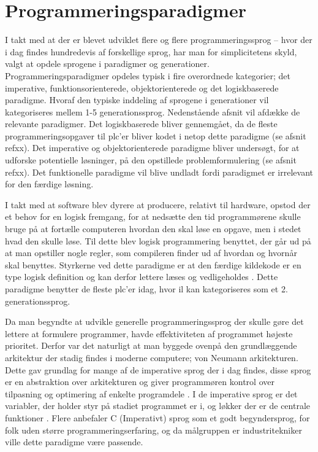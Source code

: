\section{Programmeringsparadigmer}\label{sec:paradigmer}\label{ssec:hovedparadigmer}

I takt med at der er blevet udviklet flere og flere programmeringssprog – hvor der i dag findes hundredevis af forskellige sprog, har man for simplicitetens skyld, valgt at opdele sprogene i paradigmer og generationer. Programmeringsparadigmer opdeles typisk i fire overordnede kategorier; det imperative, funktionsorienterede, objektorienterede og det logiskbaserede paradigme. Hvoraf den typiske inddeling af sprogene i generationer vil kategoriseres mellem 1-5 generationssprog. Nedenstående afsnit vil afdække de relevante paradigmer. Det logiskbaserede bliver gennemgået, da de fleste programmeringsopgaver til \gls{plc}’er bliver kodet i netop dette paradigme (se afsnit refxx). Det imperative og objektorienterede paradigme bliver undersøgt, for at udforske potentielle løsninger, på den opstillede problemformulering (se afsnit refxx). Det funktionelle paradigme vil blive undladt fordi paradigmet er irrelevant for den færdige løsning.

I takt med at software blev dyrere at producere, relativt til hardware, opstod der et behov for en logisk fremgang, for at nedsætte den tid programmørene skulle bruge på at fortælle computeren hvordan den skal løse en opgave, men i stedet hvad den skulle løse. Til dette blev logisk programmering benyttet, der går ud på at man opstiller nogle regler, som compileren finder ud af hvordan og hvornår skal benyttes. Styrkerne ved dette paradigme er at den færdige kildekode er en type logisk definition og kan derfor lettere læses og vedligeholdes \cite[kapitel 16]{Sebesta_2013}. Dette paradigme benytter de fleste \gls{plc}'er idag, hvor \gls{il} kan kategoriseres som et 2. generationssprog.

Da man begyndte at udvikle generelle programmeringssprog der skulle gøre det lettere at formulere programmer, havde effektiviteten af programmet højeste prioritet. Derfor var det naturligt at man byggede ovenpå den grundlæggende arkitektur der stadig findes i moderne computere; von Neumann arkitekturen. Dette gav grundlag for mange af de imperative sprog der i dag findes, disse sprog er en abstraktion over arkitekturen og giver programmøren kontrol over tilpasning og optimering af enkelte programdele \cite[38-39]{Sebesta_2013}. I de imperative sprog er det variabler, der holder styr på stadiet programmet er i, og løkker der er de centrale funktioner \cite{Sebesta_2013}. Flere anbefaler C (Imperativt) sprog som et godt begyndersprog, for folk uden større programmeringserfaring, og da målgruppen er industritekniker ville dette paradigme være passende.

